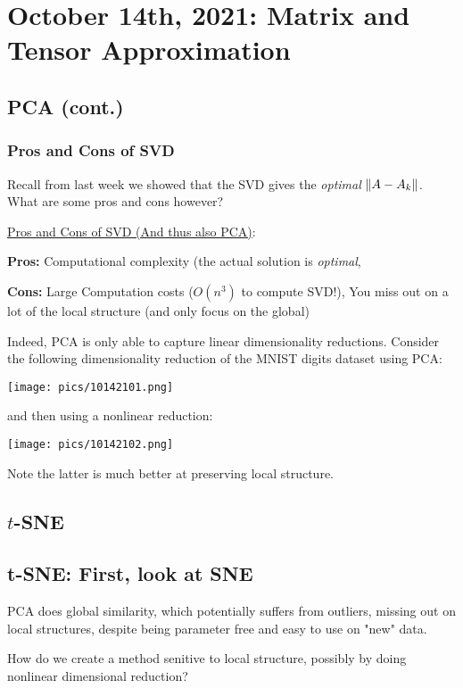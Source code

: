 \documentclass[11pt]{scrartcl}
\begin{document}
\newpage

\section{October 14th, 2021: Matrix and Tensor Approximation}

\subsection{PCA (cont.)}
\subsubsection{Pros and Cons of SVD}
Recall from last week we showed that the SVD gives the \textit{optimal} $\left\lVert A-A_k\right\rVert$. What are some pros and cons however?

\underline{Pros and Cons of SVD (And thus also PCA)}:

\textbf{Pros:} Computational complexity (the actual solution is \textit{optimal},

\textbf{Cons:} Large Computation costs ($O(n^3)$ to compute SVD!), You miss out on a lot of the local structure (and only focus on the global)

Indeed, PCA is only able to capture linear dimensionality reductions. Consider the following dimensionality reduction of the MNIST digits dataset using PCA:
\begin{center}
    \texttt{[image: pics/10142101.png]}
\end{center}
and then using a nonlinear reduction:
\begin{center}
    \texttt{[image: pics/10142102.png]}
\end{center}
Note the latter is much better at preserving local structure.

\subsection{$t$-SNE}
\subsection{t-SNE: First, look at SNE}
PCA does global similarity, which potentially suffers from outliers, missing out on local structures, despite being parameter free and easy to use on "new" data. 

How do we create a method senitive to local structure, possibly by doing nonlinear dimensional reduction? 
\end{document}
